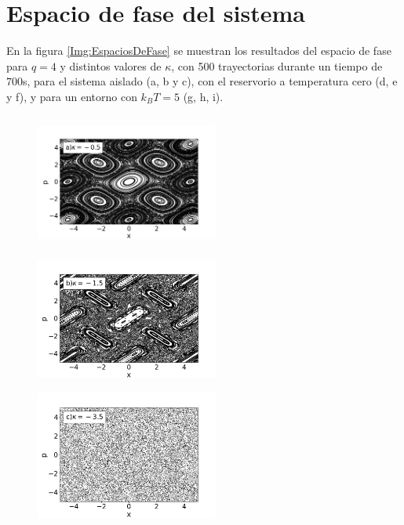 \documentclass[letterpaper,12pt,oneside]{book}
\begin{document}
\section{Espacio de fase del sistema}

En la figura \ref{Img:EspaciosDeFase} se muestran los resultados del espacio de fase para $q=4$ y distintos valores de $\kappa$, con 500 trayectorias durante un tiempo de 700s, para el sistema aislado (a, b y c), con el reservorio a temperatura cero (d, e y f), y para un entorno con $k_BT = 5$ (g, h, i).

\begin{figure}[h!]\label{EspaciosDeFase}
	
	\centering
	\begin{minipage}{0.32\textwidth}
		
		\includegraphics[width=6cm,height=4.5cm]{FigsJPG/PhaseSpace_a}
	\end{minipage}
	\begin{minipage}{0.32\textwidth}
		\includegraphics[width=6cm,height=4.5cm]{FigsJPG/PhaseSpace_b}
	\end{minipage}
	\begin{minipage}{0.32\textwidth}
		\includegraphics[width=6cm,height=4.5cm]{FigsJPG/PhaseSpace_c}
		

\end{minipage}
\end{figure}
\end{document}
